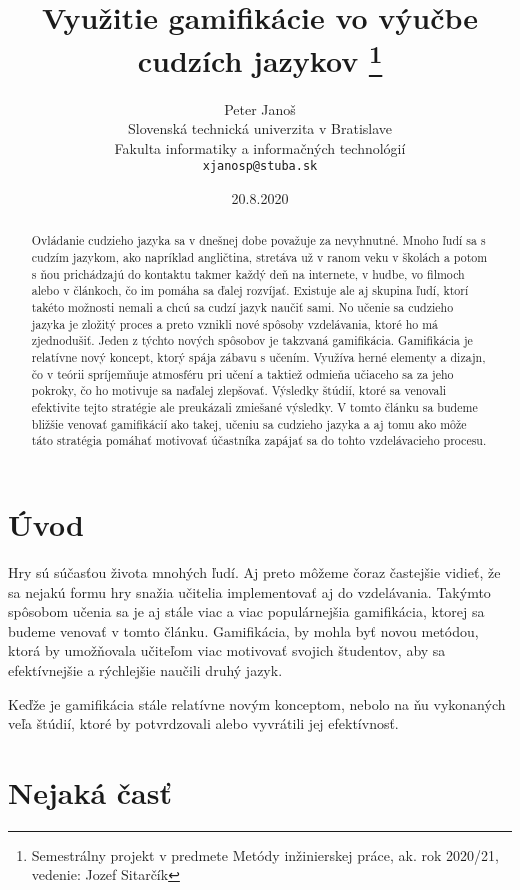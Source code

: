 \documentclass[10pt,twoside,slovak,a4paper]{article}
\title{Využitie gamifikácie vo výučbe cudzích jazykov \thanks{Semestrálny projekt v predmete Metódy inžinierskej práce, ak. rok 2020/21, vedenie: Jozef Sitarčík}} %
\author{Peter Janoš\\[2pt]
	{\small Slovenská technická univerzita v Bratislave}\\
	{\small Fakulta informatiky a informačných technológií}\\
	{\small \texttt{xjanosp@stuba.sk}}
	}
\date{\small 20.8.2020} %
\begin{document}
\maketitle

\begin{abstract}
Ovládanie cudzieho jazyka sa v dnešnej dobe považuje za nevyhnutné. Mnoho ľudí sa s cudzím jazykom, ako napríklad angličtina, stretáva už v ranom veku v školách a potom s ňou prichádzajú do kontaktu takmer každý deň na internete, v hudbe, vo filmoch alebo v článkoch, čo im pomáha sa ďalej rozvíjať. Existuje ale aj skupina ľudí, ktorí takéto možnosti nemali a chcú sa cudzí jazyk naučiť sami. No učenie sa cudzieho jazyka je zložitý proces a preto vznikli nové spôsoby vzdelávania, ktoré ho má zjednodušiť. Jeden z týchto nových spôsobov je takzvaná gamifikácia. Gamifikácia je relatívne nový koncept, ktorý spája zábavu s učením. Využíva herné elementy a dizajn, čo v teórii spríjemňuje atmosféru pri učení a taktiež odmieňa učiaceho sa za jeho pokroky, čo ho motivuje sa naďalej zlepšovať. Výsledky štúdií, ktoré sa venovali efektivite tejto stratégie ale preukázali zmiešané výsledky. V tomto článku sa budeme bližšie venovať gamifikácií ako takej, učeniu sa cudzieho jazyka a aj tomu ako môže táto stratégia pomáhať motivovať účastníka zapájať sa do tohto vzdelávacieho procesu.
\end{abstract}



\section{Úvod}

Hry sú súčasťou života mnohých ľudí. Aj preto môžeme čoraz častejšie vidieť, že sa nejakú formu hry snažia učitelia implementovať aj do vzdelávania. Takýmto spôsobom učenia sa je aj stále viac a viac populárnejšia gamifikácia, ktorej sa budeme venovať v tomto článku. Gamifikácia, by mohla byť novou metódou, ktorá by umožňovala učiteľom viac motivovať svojich študentov, aby sa efektívnejšie a rýchlejšie naučili druhý jazyk. 

Keďže je gamifikácia stále relatívne novým konceptom, nebolo na ňu vykonaných veľa štúdií, ktoré by potvrdzovali alebo vyvrátili jej efektívnosť.

\section{Nejaká časť} \label{nejaka}
\end{document}

